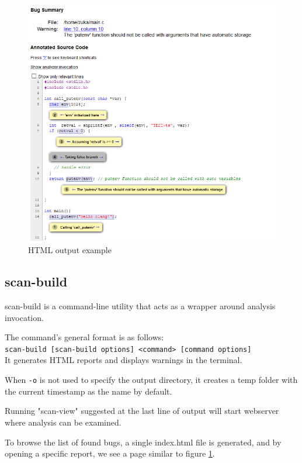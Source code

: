 \begin{figure}[H]
	\centering
	\includegraphics[width=\textwidth]{images/html_out.PNG}
	\caption{HTML output example}
	\label{fig:html-output}
\end{figure}

\subsection{scan-build}
scan-build \cite{scan-build} is a command-line utility that acts as a wrapper around analysis invocation.

The command's general format is as follows: \\
\lstinline{scan-build [scan-build options] <command> [command options]} \\ 
It generates HTML reports and displays warnings in the terminal.

When \lstinline{-o} is not used to specify the output directory, it creates a temp folder with the current timestamp as the name by default. 

Running "scan-view" suggested at the last line of output will start webserver where analysis can be examined.


To browse the list of found bugs, a single index.html file is generated, and by opening a specific report, we see a page similar to figure \ref{fig:html-output}. 


